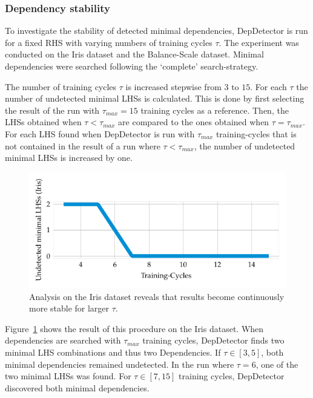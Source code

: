 \subsubsection{Dependency stability}
To investigate the stability of detected minimal dependencies, DepDetector is run for a fixed RHS with varying numbers of training cycles \( \tau \).
The experiment was conducted on the Iris dataset and the Balance-Scale dataset.
Minimal dependencies were searched following the `complete' search-strategy.

The number of training cycles \( \tau \) is increased stepwise from \( 3 \text{ to } 15 \).
For each \( \tau \) the number of undetected minimal LHSs is calculated.
This is done by first selecting the result of the run with \( \tau_{max} = 15 \) training cycles as a reference.
Then, the LHSs obtained when \( \tau < \tau_{max} \) are compared to the ones obtained when \( \tau = \tau_{max} \).
For each LHS found when DepDetector is run with \( \tau_{max} \) training-cycles that is not contained in the result of a run where \( \tau < \tau_{max} \), the number of undetected minimal LHSs is increased by one.

\begin{figure}[ht]
     \centering
     \includegraphics[width=\textwidth]{../figures/iris/dep_detector_lhs_stability}
     \caption{Analysis on the Iris dataset reveals that results become continuously more stable for larger \( \tau \).}
     \label{fig:dep_detector_lhs_stability_iris}
\end{figure}

Figure~\ref{fig:dep_detector_lhs_stability_iris} shows the result of this procedure on the Iris dataset.
When dependencies are searched with \( \tau_{max} \) training cycles, DepDetector finds two minimal LHS combinations and thus two Dependencies.
If \( \tau \in [3, 5] \), both minimal dependencies remained undetected.
In the run where \( \tau = 6 \), one of the two minimal LHSs was found.
For \( \tau \in [7, 15] \) training cycles, DepDetector discovered both minimal dependencies.

